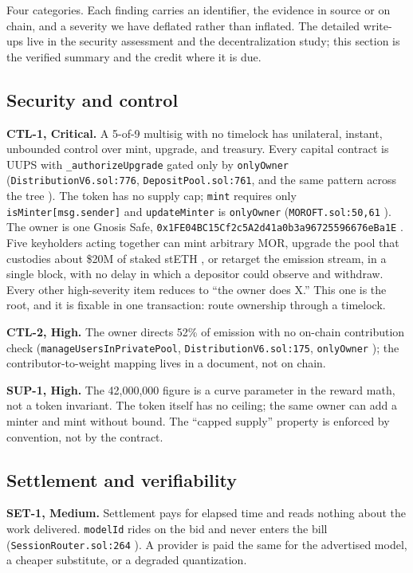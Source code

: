 \documentclass[11pt,a4paper]{article}
\newcommand{\code}[1]{\texttt{\small #1}}
\newcommand{\prov}[1]{{\color{muted}\footnotesize\sffamily[#1]}}
\begin{document}
Four categories. Each finding carries an identifier, the evidence in source or on chain, and a
severity we have deflated rather than inflated. The detailed write-ups live in the security
assessment and the decentralization study; this section is the verified summary and the credit
where it is due.

\subsection{Security and control}

\textbf{CTL-1, Critical.} A 5-of-9 multisig with no timelock has unilateral, instant, unbounded
control over mint, upgrade, and treasury. Every capital contract is UUPS with
\code{\_authorizeUpgrade} gated only by \code{onlyOwner} (\code{DistributionV6.sol:776},
\code{DepositPool.sol:761}, and the same pattern across the tree \prov{verified}). The token
has no supply cap; \code{mint} requires only \code{isMinter[msg.sender]} and \code{updateMinter}
is \code{onlyOwner} (\code{MOROFT.sol:50,61} \prov{verified}). The owner is one Gnosis Safe,
\code{0x1FE04BC15Cf2c5A2d41a0b3a96725596676eBa1E} \prov{verified}. Five keyholders acting
together can mint arbitrary MOR, upgrade the pool that custodies about \$20M of staked stETH
\prov{verified}, or retarget the emission stream, in a single block, with no delay in which a
depositor could observe and withdraw. Every other high-severity item reduces to ``the owner
does X.'' This one is the root, and it is fixable in one transaction: route ownership through a
timelock.

\textbf{CTL-2, High.} The owner directs 52\% of emission with no on-chain contribution check
(\code{manageUsersInPrivatePool}, \code{DistributionV6.sol:175}, \code{onlyOwner}
\prov{verified}); the contributor-to-weight mapping lives in a document, not on chain.

\textbf{SUP-1, High.} The 42,000,000 figure is a curve parameter in the reward math, not a
token invariant. The token itself has no ceiling; the same owner can add a minter and mint
without bound. The ``capped supply'' property is enforced by convention, not by the contract.

\subsection{Settlement and verifiability}

\textbf{SET-1, Medium.} Settlement pays for elapsed time and reads nothing about the work
delivered. \code{modelId} rides on the bid and never enters the bill
(\code{SessionRouter.sol:264} \prov{verified}). A provider is paid the same for the advertised
model, a cheaper substitute, or a degraded quantization.
\end{document}
